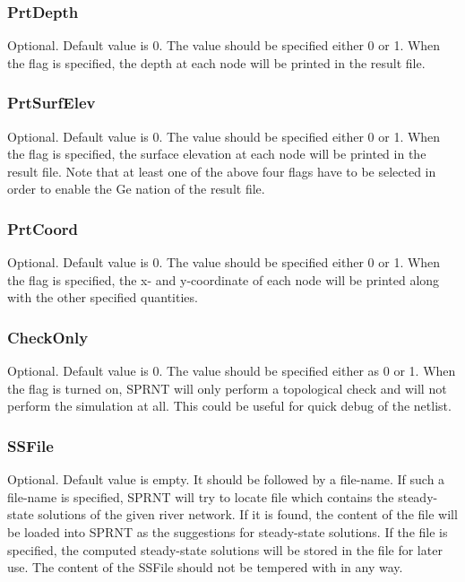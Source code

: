 \documentclass[10pt, letterpaper]{article}
\begin{document}
\subsubsection{PrtDepth}
\label{subsubsec:prtd}
Optional. Default value is 0. The value should be specified either 0 or 1. When the flag
is specified, the depth at each node will be printed in the result file.

\subsubsection{PrtSurfElev}
\label{subsubsec:prtsfe}
Optional. Default value is 0. The value should be specified either 0 or 1. When the flag
is specified, the surface elevation at each node will be printed in the result file. Note
that at least one of the above four flags have to be selected in order to enable the Ge nation of
the result file.

\subsubsection{PrtCoord}
\label{subsubsec:prtcoord}
Optional. Default value is 0. The value should be specified either 0 or 1. When the flag
is specified, the x- and y-coordinate of each node will be printed along with the other
specified quantities.


\subsubsection{CheckOnly}
\label{subsubsec:co}
Optional. Default value is 0. The value should be specified either as 0 or 1. When the
flag is turned on, SPRNT will only perform a topological check and will not perform the
simulation at all.  This could be useful for quick debug of the netlist.

\subsubsection{SSFile}
\label{subsubsec:ssf}
Optional. Default value is empty. It should be followed by a file-name. If such a file-name
is specified, SPRNT will try to locate file which contains the steady-state solutions of
the given river network. If it is found, the content of the file will be loaded into
SPRNT as the suggestions for steady-state solutions. If the file is specified,
the computed steady-state solutions will be stored in the file for later use.
The content of the SSFile should not be tempered with in any way.
\end{document}
